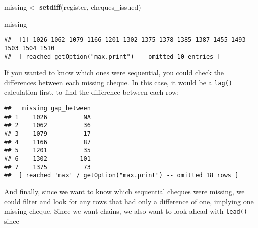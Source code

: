 \documentclass[
]{book}
\newenvironment{Shaded}{\begin{snugshade}}{\end{snugshade}}
\newcommand{\CommentTok}[1]{\textcolor[rgb]{0.56,0.35,0.01}{\textit{#1}}}
\newcommand{\DataTypeTok}[1]{\textcolor[rgb]{0.13,0.29,0.53}{#1}}
\newcommand{\DecValTok}[1]{\textcolor[rgb]{0.00,0.00,0.81}{#1}}
\newcommand{\KeywordTok}[1]{\textcolor[rgb]{0.13,0.29,0.53}{\textbf{#1}}}
\newcommand{\NormalTok}[1]{#1}
\newcommand{\OperatorTok}[1]{\textcolor[rgb]{0.81,0.36,0.00}{\textbf{#1}}}
\newcommand{\StringTok}[1]{\textcolor[rgb]{0.31,0.60,0.02}{#1}}
\begin{document}
\begin{Shaded}
\begin{Highlighting}[]
\NormalTok{missing <-}\StringTok{ }\KeywordTok{setdiff}\NormalTok{(register, cheques_issued)}

\NormalTok{missing}
\end{Highlighting}
\end{Shaded}

\begin{verbatim}
##  [1] 1026 1062 1079 1166 1201 1302 1375 1378 1385 1387 1455 1493 1503 1504 1510
##  [ reached getOption("max.print") -- omitted 10 entries ]
\end{verbatim}

If you wanted to know which ones were sequential, you could check the differences between each missing cheque. In this case, it would be a \texttt{lag()} calculation first, to find the difference between each row:

\begin{Shaded}
\end{Shaded}

\begin{verbatim}
##   missing gap_between
## 1    1026          NA
## 2    1062          36
## 3    1079          17
## 4    1166          87
## 5    1201          35
## 6    1302         101
## 7    1375          73
##  [ reached 'max' / getOption("max.print") -- omitted 18 rows ]
\end{verbatim}

And finally, since we want to know which sequential cheques were missing, we could filter and look for any rows that had only a difference of one, implying one missing cheque. Since we want chains, we also want to look ahead with \texttt{lead()} since

\begin{Shaded}
\end{Shaded}
\end{document}

